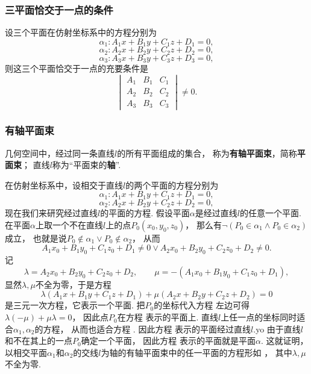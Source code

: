 \subsubsection{三平面恰交于一点的条件}
\begin{theorem}
设三个平面在仿射坐标系中的方程分别为\[
	\alpha_1: A_1 x + B_1 y + C_1 z + D_1 = 0,
\]\[
	\alpha_2: A_2 x + B_2 y + C_2 z + D_2 = 0,
\]\[
	\alpha_3: A_3 x + B_3 y + C_3 z + D_3 = 0,
\]
则这三个平面恰交于一点的充要条件是\[
	\begin{vmatrix}
		A_1 & B_1 & C_1 \\
		A_2 & B_2 & C_2 \\
		A_3 & B_3 & C_3
	\end{vmatrix}
	\neq 0.
\]
\end{theorem}

\subsubsection{有轴平面束}
几何空间中，经过同一条直线\(l\)的所有平面组成的集合，
称为\textbf{有轴平面束}，简称\textbf{平面束}；
直线\(l\)称为“平面束的\textbf{轴}”.

在仿射坐标系中，设相交于直线\(l\)的两个平面的方程分别为\[
	\alpha_1: A_1 x + B_1 y + C_1 z + D_1 = 0,
\]\[
	\alpha_2: A_2 x + B_2 y + C_2 z + D_2 = 0,
\]
现在我们来研究经过直线\(l\)的平面的方程.
假设平面\(\alpha\)是经过直线\(l\)的任意一个平面.
在平面\(\alpha\)上取一个不在直线\(l\)上的点\(P_0(x_0,y_0,z_0)\)，
那么有\(\neg(P_0 \in \alpha_1 \land P_0 \in \alpha_2)\)成立，
也就是说\(P_0 \notin \alpha_1 \lor P_0 \notin \alpha_2\)，
从而\[
	A_1 x_0 + B_1 y_0 + C_1 z_0 + D_1 \neq 0
	\lor
	A_2 x_0 + B_2 y_0 + C_2 z_0 + D_2 \neq 0.
\]
记\[
	\lambda = A_2 x_0 + B_2 y_0 + C_2 z_0 + D_2, \qquad
	\mu = -(A_1 x_0 + B_1 y_0 + C_1 z_0 + D_1),
\]
显然\(\lambda,\mu\)不全为零，于是方程
\begin{equation}\label{equation:解析几何.由两个相交平面确定的有轴平面束方程}
	\lambda	(A_1 x + B_1 y + C_1 z + D_1)
	+ \mu	(A_2 x + B_2 y + C_2 z + D_2) = 0
\end{equation}
是三元一次方程，它表示一个平面.
把\(P_0\)的坐标代入方程 
左边可得\(\lambda(-\mu)+\mu\lambda=0\)，
因此点\(P_0\)在方程  表示的平面上.
直线\(l\)上任一点的坐标同时适合\(\alpha_1,\alpha_2\)的方程，
从而也适合方程 .
因此方程 
表示的平面经过直线\(l\).yo
由于直线\(l\)和不在其上的一点\(P_0\)确定一个平面，
因此方程 
表示的平面就是平面\(\alpha\).
这就证明，以相交平面\(\alpha_1\)和\(\alpha_2\)的交线\(l\)为轴的有轴平面束中的任一平面的方程形如 ，
其中\(\lambda,\mu\)不全为零.

